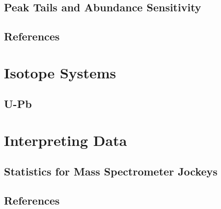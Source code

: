 \documentclass[
  letterpaper,
  DIV=11,
  numbers=noendperiod]{scrreprt}
\newlength{\cslhangindent}
\newenvironment{CSLReferences}[2] %
 {\begin{list}{}{%
  \setlength{\itemindent}{0pt}
  \setlength{\leftmargin}{0pt}
  \setlength{\parsep}{0pt}
  \ifodd #1
   \setlength{\leftmargin}{\cslhangindent}
   \setlength{\itemindent}{-1\cslhangindent}
  \fi
  \setlength{\itemsep}{#2\baselineskip}}}
 {\end{list}}
\begin{document}
\chapter{Peak Tails and Abundance
Sensitivity}\label{peak-tails-and-abundance-sensitivity}

\chapter*{References}\label{references-1}


\label{refs}
\begin{CSLReferences}{0}{1}
\end{CSLReferences}

\part{Isotope Systems}

\chapter{U-Pb}\label{u-pb}

\part{Interpreting Data}

\chapter{Statistics for Mass Spectrometer
Jockeys}\label{statistics-for-mass-spectrometer-jockeys}


\chapter*{References}\label{references-2}


\label{refs}
\begin{CSLReferences}{0}{1}
\end{CSLReferences}
\end{document}
